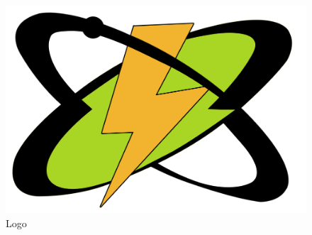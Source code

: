\begin{figure}[htbp]
\centering
\includegraphics[scale=0.45]{fig/logo.png}
\caption{Logo}
\label{img:1}
\end{figure}